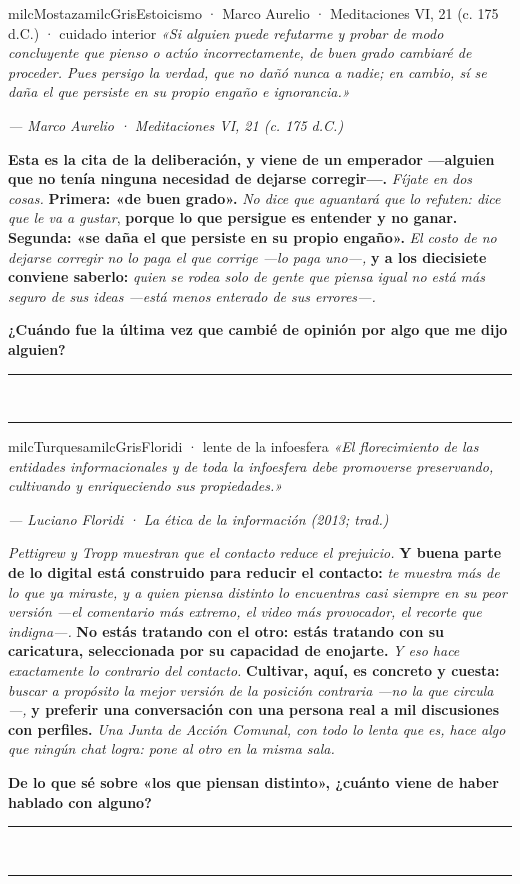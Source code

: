 \documentclass[11pt,letterpaper]{article}
\newcommand{\linead}[1]{\noindent\color{milcLinea}\rule{#1}{0.5pt}\color{milcNegro}}
\begin{document}
\begin{softbox}{milcMostaza}{milcGris}{Estoicismo · Marco Aurelio · Meditaciones VI, 21 (c. 175 d.C.) · cuidado interior}
\textit{«Si alguien puede refutarme y probar de modo concluyente que pienso o actúo incorrectamente, de buen grado cambiaré de proceder. Pues persigo la verdad, que no dañó nunca a nadie; en cambio, sí se daña el que persiste en su propio engaño e ignorancia.»}

{\footnotesize\itshape\color{milcNegro!70}--- Marco Aurelio · Meditaciones VI, 21 (c. 175 d.C.)}

\textbf{Esta es la cita de la deliberación, y viene de un emperador ---alguien que no tenía ninguna necesidad de dejarse corregir---.} \emph{Fíjate en dos cosas.} \textbf{Primera: «de buen grado».} \emph{No dice que aguantará que lo refuten: dice que le va a gustar}, \textbf{porque lo que persigue es entender y no ganar.} \textbf{Segunda: «se daña el que persiste en su propio engaño».} \emph{El costo de no dejarse corregir no lo paga el que corrige ---lo paga uno---,} \textbf{y a los diecisiete conviene saberlo:} \emph{quien se rodea solo de gente que piensa igual no está más seguro de sus ideas ---está menos enterado de sus errores---.}

\textbf{¿Cuándo fue la última vez que cambié de opinión por algo que me dijo alguien?}
\end{softbox}
\linead{\linewidth}\\[1mm]
\linead{\linewidth}

\begin{softbox}{milcTurquesa}{milcGris}{Floridi · lente de la infoesfera}
\textit{«El florecimiento de las entidades informacionales y de toda la infoesfera debe promoverse preservando, cultivando y enriqueciendo sus propiedades.»}

{\footnotesize\itshape\color{milcNegro!70}--- Luciano Floridi · La ética de la información (2013; trad.)}

\emph{Pettigrew y Tropp muestran que el contacto reduce el prejuicio.} \textbf{Y buena parte de lo digital está construido para reducir el contacto:} \emph{te muestra más de lo que ya miraste, y a quien piensa distinto lo encuentras casi siempre en su peor versión ---el comentario más extremo, el video más provocador, el recorte que indigna---.} \textbf{No estás tratando con el otro: estás tratando con su caricatura, seleccionada por su capacidad de enojarte.} \emph{Y eso hace exactamente lo contrario del contacto.} \textbf{Cultivar, aquí, es concreto y cuesta:} \emph{buscar a propósito la mejor versión de la posición contraria ---no la que circula---,} \textbf{y preferir una conversación con una persona real a mil discusiones con perfiles.} \emph{Una Junta de Acción Comunal, con todo lo lenta que es, hace algo que ningún chat logra: pone al otro en la misma sala.}

\textbf{De lo que sé sobre «los que piensan distinto», ¿cuánto viene de haber hablado con alguno?}
\end{softbox}
\linead{\linewidth}\\[1mm]
\linead{\linewidth}
\end{document}
